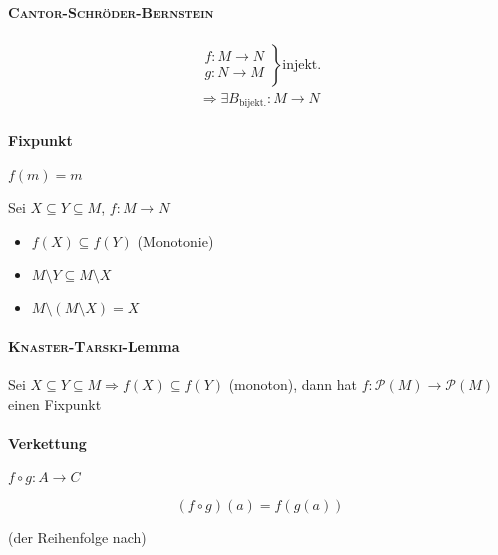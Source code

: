 \paragraph{\textsc{Cantor-Schröder-Bernstein}}

\begin{gather*}
  \left.\begin{array}{l}
    f: M \rightarrow N \\
    g: N \rightarrow M
  \end{array}\right\} \text{injekt.}\\ \Rightarrow \exists B_\text{bijekt.}: M \rightarrow N
\end{gather*}

\paragraph{Fixpunkt}
$f(m) = m$

Sei $X \subseteq Y \subseteq M$, $f: M \rightarrow N$

\begin{itemize}
  \item $f(X) \subseteq f(Y)$ (Monotonie)
  \item $M \setminus Y \subseteq M \setminus X$
  \item $M \setminus (M \setminus X) = X$
\end{itemize}

\paragraph{\textsc{Knaster-Tarski}-Lemma}

Sei $X \subseteq Y \subseteq M \Rightarrow f(X) \subseteq f(Y)$ (monoton), dann hat $f: \mathcal{P}(M) \rightarrow \mathcal{P}(M)$ einen Fixpunkt

\paragraph{Verkettung} $f \circ g: A \rightarrow C$

$$(f \circ g) (a) = f(g(a))$$

(der Reihenfolge nach)


